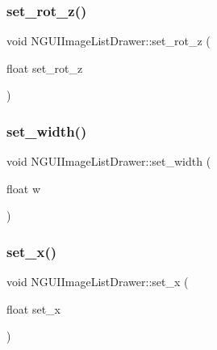 \hypertarget{class_n_g_u_i_image_list_drawer_a7e6d66a70f57a14619911e3d9254d949}{}\label{class_n_g_u_i_image_list_drawer_a7e6d66a70f57a14619911e3d9254d949} 
\subsubsection{\texorpdfstring{set\+\_\+rot\+\_\+z()}{set\_rot\_z()}}
{\footnotesize\ttfamily void N\+G\+U\+I\+Image\+List\+Drawer\+::set\+\_\+rot\+\_\+z (\begin{DoxyParamCaption}\item[{float}]{set\+\_\+rot\+\_\+z }\end{DoxyParamCaption})}

\hypertarget{class_n_g_u_i_image_list_drawer_a61ba458fd4362bdf87b99bc7a0a1fba4}{}\label{class_n_g_u_i_image_list_drawer_a61ba458fd4362bdf87b99bc7a0a1fba4} 
\subsubsection{\texorpdfstring{set\+\_\+width()}{set\_width()}}
{\footnotesize\ttfamily void N\+G\+U\+I\+Image\+List\+Drawer\+::set\+\_\+width (\begin{DoxyParamCaption}\item[{float}]{w }\end{DoxyParamCaption})}

\hypertarget{class_n_g_u_i_image_list_drawer_a2c4a8c9834629a89788e4abc422572bd}{}\label{class_n_g_u_i_image_list_drawer_a2c4a8c9834629a89788e4abc422572bd} 
\subsubsection{\texorpdfstring{set\+\_\+x()}{set\_x()}}
{\footnotesize\ttfamily void N\+G\+U\+I\+Image\+List\+Drawer\+::set\+\_\+x (\begin{DoxyParamCaption}\item[{float}]{set\+\_\+x }\end{DoxyParamCaption})}

